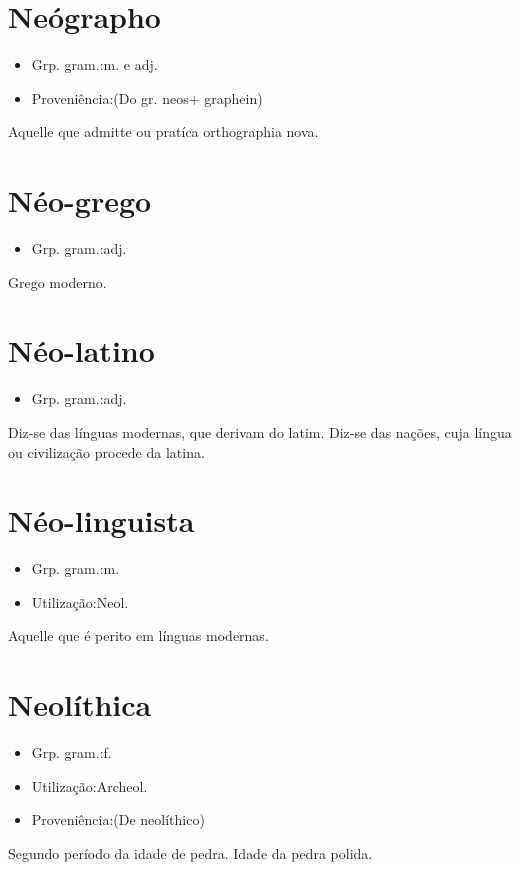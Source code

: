 \section{Neógrapho}
\begin{itemize}
\item {Grp. gram.:m.  e  adj.}
\end{itemize}
\begin{itemize}
\item {Proveniência:(Do gr. \textunderscore neos\textunderscore  + \textunderscore graphein\textunderscore )}
\end{itemize}
Aquelle que admitte ou pratíca orthographia nova.
\section{Néo-grego}
\begin{itemize}
\item {Grp. gram.:adj.}
\end{itemize}
Grego moderno.
\section{Néo-latino}
\begin{itemize}
\item {Grp. gram.:adj.}
\end{itemize}
Diz-se das línguas modernas, que derivam do latim.
Diz-se das nações, cuja língua ou civilização procede da latina.
\section{Néo-linguista}
\begin{itemize}
\item {Grp. gram.:m.}
\end{itemize}
\begin{itemize}
\item {Utilização:Neol.}
\end{itemize}
Aquelle que é perito em línguas modernas.
\section{Neolíthica}
\begin{itemize}
\item {Grp. gram.:f.}
\end{itemize}
\begin{itemize}
\item {Utilização:Archeol.}
\end{itemize}
\begin{itemize}
\item {Proveniência:(De \textunderscore neolíthico\textunderscore )}
\end{itemize}
Segundo período da idade de pedra.
Idade da pedra polida.
